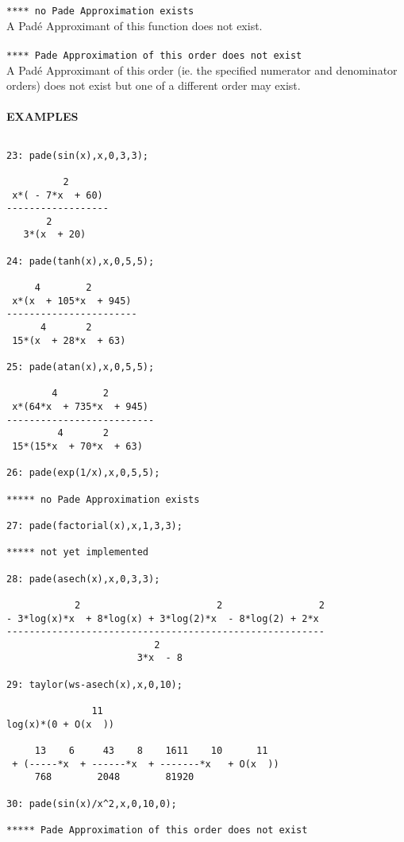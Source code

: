 {\tt ***** no Pade Approximation exists}\\

A Pad\'{e} Approximant of this function does not exist.\\ \\

{\tt ***** Pade Approximation of this order does not exist}\\

A Pad\'{e} Approximant of this order (ie. the specified
numerator and denominator orders) does not exist but one
of a different order may exist.\\ \\


\large{{\bf EXAMPLES}}

\begin{verbatim}

23: pade(sin(x),x,0,3,3);

          2
 x*( - 7*x  + 60)
------------------
       2
   3*(x  + 20)

24: pade(tanh(x),x,0,5,5);

     4        2
 x*(x  + 105*x  + 945)
-----------------------
      4       2
 15*(x  + 28*x  + 63)

25: pade(atan(x),x,0,5,5);

        4        2
 x*(64*x  + 735*x  + 945)
--------------------------
         4       2
 15*(15*x  + 70*x  + 63)

26: pade(exp(1/x),x,0,5,5);

***** no Pade Approximation exists

27: pade(factorial(x),x,1,3,3);

***** not yet implemented

28: pade(asech(x),x,0,3,3);

            2                        2                 2
- 3*log(x)*x  + 8*log(x) + 3*log(2)*x  - 8*log(2) + 2*x
--------------------------------------------------------
                          2
                       3*x  - 8

29: taylor(ws-asech(x),x,0,10);

               11  
log(x)*(0 + O(x  ))

     13    6     43    8    1611    10      11
 + (-----*x  + ------*x  + -------*x   + O(x  ))
     768        2048        81920

30: pade(sin(x)/x^2,x,0,10,0);

***** Pade Approximation of this order does not exist




\end{verbatim}
